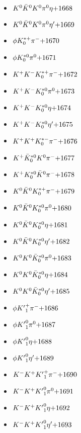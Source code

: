 \begin{multicols}{3}
\begin{itemize}
 \item $ K^{0} \bar{K}^{0} K^{0} \pi^{0} \eta \hfill{+1668}$
 \item $ K^{0} \bar{K}^{0} K^{0} \pi^{0} {\eta^{\prime}} \hfill{+1669}$
 \item $ \phi K_{0}^{*+} \pi^{-} \hfill{+1670}$
 \item $ \phi K_{0}^{*0} \pi^{0} \hfill{+1671}$
 \item $ K^{+} K^{-} K_{0}^{*+} \pi^{-} \hfill{+1672}$
 \item $ K^{+} K^{-} K_{0}^{*0} \pi^{0} \hfill{+1673}$
 \item $ K^{+} K^{-} K_{0}^{*0} \eta \hfill{+1674}$
 \item $ K^{+} K^{-} K_{0}^{*0} {\eta^{\prime}} \hfill{+1675}$
 \item $ K^{+} K^{+} K_{0}^{*-} \pi^{-} \hfill{+1676}$
 \item $ K^{+} \bar{K}_{0}^{*0} K^{0} \pi^{-} \hfill{+1677}$
 \item $ K^{+} K_{0}^{*0} \bar{K}^{0} \pi^{-} \hfill{+1678}$
 \item $ K^{0} \bar{K}^{0} K_{0}^{*+} \pi^{-} \hfill{+1679}$
 \item $ K^{0} \bar{K}^{0} K_{0}^{*0} \pi^{0} \hfill{+1680}$
 \item $ K^{0} \bar{K}^{0} K_{0}^{*0} \eta \hfill{+1681}$
 \item $ K^{0} \bar{K}^{0} K_{0}^{*0} {\eta^{\prime}} \hfill{+1682}$
 \item $ K^{0} K^{0} \bar{K}_{0}^{*0} \pi^{0} \hfill{+1683}$
 \item $ K^{0} K^{0} \bar{K}_{0}^{*0} \eta \hfill{+1684}$
 \item $ K^{0} K^{0} \bar{K}_{0}^{*0} {\eta^{\prime}} \hfill{+1685}$
 \item $ \phi {K^{\prime}}_{1}^{+} \pi^{-} \hfill{+1686}$
 \item $ \phi {K^{\prime}}_{1}^{0} \pi^{0} \hfill{+1687}$
 \item $ \phi {K^{\prime}}_{1}^{0} \eta \hfill{+1688}$
 \item $ \phi {K^{\prime}}_{1}^{0} {\eta^{\prime}} \hfill{+1689}$
 \item $ K^{-} K^{+} {K^{\prime}}_{1}^{+} \pi^{-} \hfill{+1690}$
 \item $ K^{-} K^{+} {K^{\prime}}_{1}^{0} \pi^{0} \hfill{+1691}$
 \item $ K^{-} K^{+} {K^{\prime}}_{1}^{0} \eta \hfill{+1692}$
 \item $ K^{-} K^{+} {K^{\prime}}_{1}^{0} {\eta^{\prime}} \hfill{+1693}$

\end{itemize}
\end{multicols}
